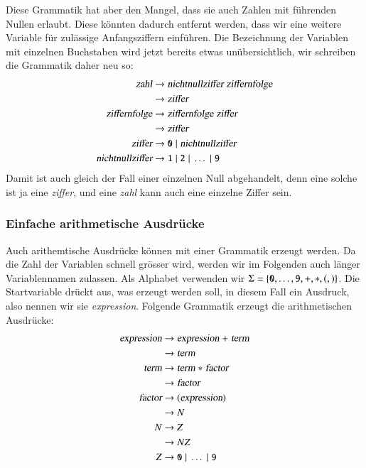Diese Grammatik hat aber den Mangel, dass sie auch Zahlen
mit führenden Nullen erlaubt.
Diese könnten dadurch entfernt
werden, dass wir eine weitere Variable für zulässige
Anfangsziffern einführen.
Die Bezeichnung der Variablen mit einzelnen Buchstaben wird jetzt
bereits etwas unübersichtlich, wir schreiben die Grammatik daher neu
so:
\begin{align*}
\textsl{zahl}           &\to\textsl{nichtnullziffer}\; \textsl{ziffernfolge} \\
                        &\to\textsl{ziffer}\\
\textsl{ziffernfolge}   &\to \textsl{ziffernfolge}\; \textsl{ziffer}\\
                        &\to \textsl{ziffer}\\
\textsl{ziffer}         &\to \texttt{0}\; |\; \textsl{nichtnullziffer}\\
\textsl{nichtnullziffer}&\to \texttt{1}\;|\;\texttt{2}\;|\;\dots\;|\;\texttt{9}
\end{align*}
Damit ist auch gleich der Fall einer einzelnen Null abgehandelt, denn eine
solche ist ja eine \textsl{ziffer}, und eine \textsl{zahl} kann auch eine
einzelne Ziffer sein.

\subsubsection{Einfache arithmetische Ausdrücke}
%
%
Auch arithemtische Ausdrücke können mit einer
Grammatik erzeugt werden. Da die Zahl der Variablen schnell grösser
wird, werden wir im Folgenden auch länger Variablennamen zulassen.
Als Alphabet verwenden wir
$\Sigma=\{{\tt 0},\dots,{\tt 9},{\tt +},{\tt *},{\tt (}, {\tt )}\}$.
Die Startvariable drückt aus, was erzeugt werden soll, in diesem Fall
ein Ausdruck, also nennen wir sie \textsl{expression}.  Folgende Grammatik
erzeugt die arithmetischen Ausdrücke:
\begin{align*}
\textsl{expression} &\to \textsl{expression}\;{\tt +}\;\textsl{term}\\
                    &\to \textsl{term}\\
\textsl{term}       &\to \textsl{term}\;{\tt *}\;\textsl{factor}\\
                    &\to \textsl{factor}\\
\textsl{factor}     &\to {\tt (}\textsl{expression}{\tt )}\\
                    &\to N\\
N                   &\to Z\\
                    &\to NZ\\
Z                   &\to {\tt 0}\;|\;\dots \;|\;{\tt 9}
\end{align*}

